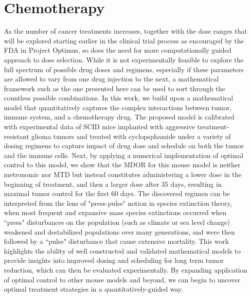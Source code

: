 \chapter{Chemotherapy}
\label{chap:chemo}

As the number of cancer treatments increases, together with the dose ranges that will be explored starting earlier in the clinical trial process as encouraged by the \ac{FDA} in Project Optimus, so does the need for more computationally guided approach to dose selection. While it is not experimentally feasible to explore the full spectrum of possible drug doses and regimens, especially if these parameters are allowed to vary from one drug injection to the next, a mathematical framework such as the one presented here can be used to sort through the countless possible combinations. In this work, we build upon a mathematical model that quantitatively captures the complex interactions between tumor, immune system, and a chemotherapy drug. The proposed model is calibrated with experimental data of \ac{SCID} mice implanted with aggressive treatment-resistant glioma tumors and treated with cyclopsphamide under a variety of dosing regimens to capture impact of drug dose and schedule on both the tumor and the immune cells. Next, by applying a numerical implementation of optimal control to this model, we show that the \ac{MDOR} for this mouse model is neither metronomic nor \ac{MTD} but instead constitutes administering a lower dose in the beginning of treatment, and then a larger dose after 35 days, resulting in maximal tumor control for the first 60 days. The discovered regimen can be interpreted from the lens of "press-pulse" notion in species extinction theory, when most frequent and expansive mass species extinctions occurred when ``press" disturbances on the population (such as climate or sea level change) weakened and destabilized populations over many generations, and were then followed by a ``pulse" disturbance that cause extensive mortality. This work highlights the ability of well constructed and validated mathematical models to provide insights into improved dosing and scheduling for long term tumor reduction, which can then be evaluated experimentally. By expanding application of optimal control to other mouse models and beyond, we can begin to uncover optimal treatment strategies in a quantitatively-guided way.

